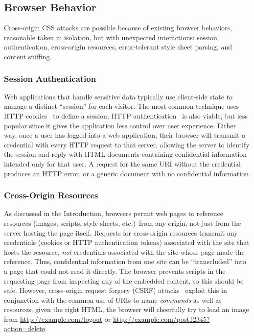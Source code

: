 \documentclass{acm_proc_article-sp}
\begin{document}
\subsection{Browser Behavior} \label{sec:behavior}

Cross-origin CSS attacks are possible because of existing browser
behaviors, reasonable taken in isolation, but with unexpected
interactions: session authentication, cross-origin resources,
error-tolerant style sheet parsing, and content sniffing.

\subsubsection{Session Authentication}
Web applications that handle sensitive data typically use client-side
state to manage a distinct “session” for each visitor.  The most
common technique uses HTTP cookies~\cite{rfc2109,httpstate} to define
a session; HTTP authentication~\cite{rfc2617} is also viable, but less
popular since it gives the application less control over user
experience.  Either way, once a user has logged into a web
application, their browser will transmit a credential with every HTTP
request to that server, allowing the server to identify the session
and reply with HTML documents containing confidential information
intended only for that user.  A request for the same URI without the
credential produces an HTTP error, or a generic document with no
confidential information.

\subsubsection{Cross-Origin Resources}
As discussed in the Introduction, browsers permit web pages to
reference resources (images, scripts, style sheets, etc.)\ from any
origin, not just from the server hosting the page itself.  Requests
for cross-origin resources transmit any credentials (cookies or HTTP
authentication tokens) associated with the site that hosts the
resource, \emph{not} credentials associated with the site whose page
made the reference.  Thus, confidential information from one site can
be “transcluded” into a page that could not read it directly.  The
browser prevents scripts in the requesting page from inspecting any of
the embedded content, so this should be safe.  However, cross-origin
request forgery (CSRF) attacks~\cite{csrf} exploit this in conjunction
with the common use of URIs to name \emph{commands} as well as
resources; given the right HTML, the browser will cheerfully try to
load an image from \url{http://example.com/logout} or
\url{http://example.com/post12345?action=delete}.
\end{document}
